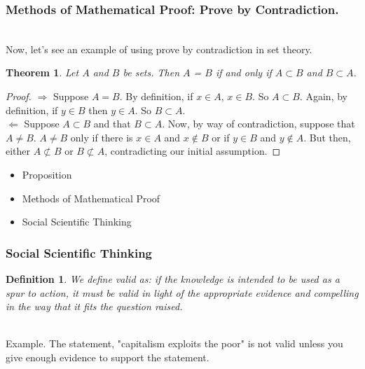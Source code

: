 \documentclass{beamer}
\newtheorem{thm}{Theorem}
\newtheorem{defn}{Definition}
\numberwithin{equation}{section}
\begin{document}
\begin{frame}
\frametitle{Methods of Mathematical Proof: Prove by Contradiction.}

\ \\Now, let's see an example of using prove by contradiction in set theory. \pause

\begin{thm} Let $A$ and $B$ be sets.  Then $A$ = $B$ if and only if $A \subset B$ and $B \subset A$. \end{thm} \pause
\begin{proof} $\Rightarrow$ Suppose $A = B$.  By definition, if $x \in A$, $x \in B$.  So $A \subset B$.  Again, by definition, if $y \in B$ then $y \in A$.  So $B \subset A$. \pause  \\
$\Leftarrow$ Suppose $A \subset B$  and that $B \subset A$. \pause Now, by way of contradiction, suppose that $A \ne B$.  \pause $A \ne B$ only if there is $x \in A $ and $x \notin B$ or if $y \in B$ and $y \notin A$.  \pause But then, either $A \not\subset B$ or $B \not\subset A$, contradicting our initial assumption.
\end{proof}

\end{frame}



\begin{frame}

\begin{itemize}
\item \textcolor{mygray}{Proposition}
\item \textcolor{mygray}{Methods of Mathematical Proof}
\item \textcolor{myblack}{Social Scientific Thinking}
\end{itemize}

\end{frame}



\begin{frame}
\frametitle{Social Scientific Thinking}

\begin{defn}
We define valid as: if the knowledge is intended to be used as a spur to action, it must be valid in light of the appropriate evidence and compelling in the way that it fits the question raised.
\end{defn} \pause

\ \\Example. The statement, "capitalism exploits the poor" is not valid unless you give enough evidence to support the statement.

\end{frame}
\end{document}
